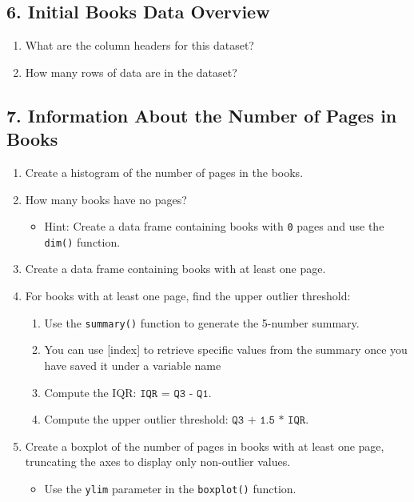 \documentclass{article}
\begin{document}
\subsection*{6. Initial Books Data Overview}
\begin{enumerate}
    \item What are the column headers for this dataset?
    \item How many rows of data are in the dataset?
\end{enumerate}

\subsection*{7. Information About the Number of Pages in Books}
\begin{enumerate}
    \item Create a histogram of the number of pages in the books.
    \item How many books have no pages?
    \begin{itemize}
        \item Hint: Create a data frame containing books with \texttt{0} pages and use the \texttt{dim()} function.
    \end{itemize}
    \item Create a data frame containing books with at least one page.
    \item For books with at least one page, find the upper outlier threshold:
    \begin{enumerate}
        \item Use the \texttt{summary()} function to generate the 5-number summary.
        \item You can use [index] to retrieve specific values from the summary once you have 
              saved it under a variable name 
        \item Compute the IQR: \(\texttt{IQR = Q3 - Q1}\).
        \item Compute the upper outlier threshold: \(\texttt{Q3 + 1.5 * IQR}\).
    \end{enumerate}
    \item Create a boxplot of the number of pages in books with at least one page, truncating the axes to display only non-outlier values.
    \begin{itemize}
        \item Use the \texttt{ylim} parameter in the \texttt{boxplot()} function.
    \end{itemize}
\end{enumerate}
\end{document}
